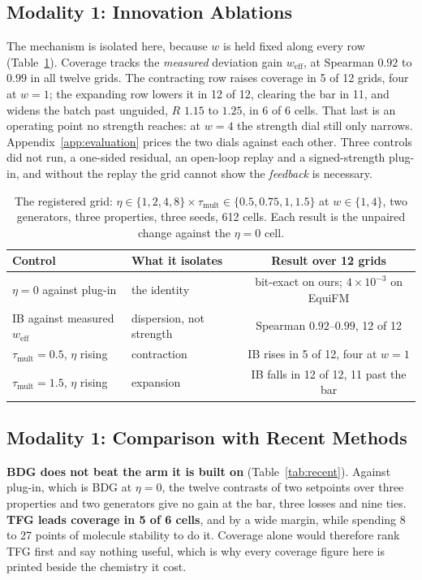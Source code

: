 \documentclass{article}
\newcommand{\weff}{w_{\mathrm{eff}}}
\begin{document}
\subsection{Modality 1: Innovation Ablations}\label{sec:ablations}
The mechanism is isolated here, because $w$ is held fixed along every row (Table~\ref{tab:ablation}). Coverage tracks the \emph{measured} deviation gain $\weff$, at Spearman $0.92$ to $0.99$ in all twelve grids. The contracting row raises coverage in 5 of 12 grids, four at $w{=}1$; the expanding row lowers it in 12 of 12, clearing the bar in 11, and widens the batch past unguided, $R$ $1.15$ to $1.25$, in 6 of 6 cells. That last is an operating point no strength reaches: at $w{=}4$ the strength dial still only narrows. Appendix~\ref{app:evaluation} prices the two dials against each other. Three controls did not run, a one-sided residual, an open-loop replay and a signed-strength plug-in, and without the replay the grid cannot show the \emph{feedback} is necessary.

\begin{table}[!htbp]
\centering\small
\caption{The registered grid: $\eta\in\{1,2,4,8\}\times\tau_{\mathrm{mult}}\in\{0.5,0.75,1,1.5\}$ at $w\in\{1,4\}$, two generators, three properties, three seeds, 612 cells. Each result is the unpaired change against the $\eta{=}0$ cell.}
\label{tab:ablation}
\begin{tabular}{llc}
\toprule
Control & What it isolates & Result over 12 grids\\
\midrule
$\eta=0$ against plug-in & the identity & bit-exact on ours; $4\times10^{-3}$ on EquiFM\\
IB against measured $\weff$ & dispersion, not strength & Spearman $0.92$--$0.99$, 12 of 12\\
$\tau_{\mathrm{mult}}{=}0.5$, $\eta$ rising & contraction & IB rises in 5 of 12, four at $w{=}1$\\
$\tau_{\mathrm{mult}}{=}1.5$, $\eta$ rising & expansion & IB falls in 12 of 12, 11 past the bar\\
\bottomrule
\end{tabular}
\end{table}


\subsection{Modality 1: Comparison with Recent Methods}\label{sec:recent}
\textbf{BDG does not beat the arm it is built on} (Table~\ref{tab:recent}). Against plug-in, which is BDG at $\eta{=}0$, the twelve contrasts of two setpoints over three properties and two generators give no gain at the bar, three losses and nine ties. \textbf{TFG leads coverage in 5 of 6 cells}, and by a wide margin, while spending 8 to 27 points of molecule stability to do it. Coverage alone would therefore rank TFG first and say nothing useful, which is why every coverage figure here is printed beside the chemistry it cost.
\end{document}
